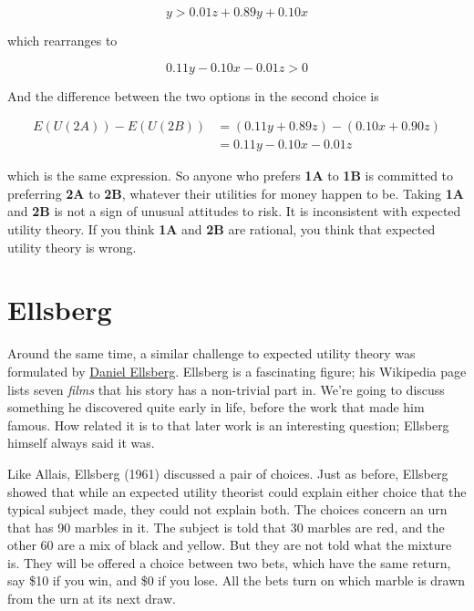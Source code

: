\documentclass[
  11pt,
  letterpaper,
]{scrbook}
\begin{document}
\begin{equation*}
y > 0.01z + 0.89y + 0.10x
\end{equation*}

which rearranges to

\begin{equation*}
0.11y - 0.10x - 0.01z > 0
\end{equation*}

And the difference between the two options in the second choice is

\begin{align*}
E(U(2A)) - E(U(2B)) &= (0.11y + 0.89z) - (0.10x + 0.90z) \\
&= 0.11y - 0.10x - 0.01z
\end{align*}

which is the same expression. So anyone who prefers \textbf{1A} to
\textbf{1B} is committed to preferring \textbf{2A} to \textbf{2B},
whatever their utilities for money happen to be. Taking \textbf{1A} and
\textbf{2B} is not a sign of unusual attitudes to risk. It is
inconsistent with expected utility theory. If you think \textbf{1A} and
\textbf{2B} are rational, you think that expected utility theory is
wrong.

\section{Ellsberg}\label{sec-ellsberg}

Around the same time, a similar challenge to expected utility theory was
formulated by
\href{https://en.wikipedia.org/wiki/Daniel_Ellsberg}{Daniel Ellsberg}.
Ellsberg is a fascinating figure; his Wikipedia page lists seven
\emph{films} that his story has a non-trivial part in. We're going to
discuss something he discovered quite early in life, before the work
that made him famous. How related it is to that later work is an
interesting question; Ellsberg himself always said it was.

Like Allais, Ellsberg (1961) discussed a pair of choices. Just as
before, Ellsberg showed that while an expected utility theorist could
explain either choice that the typical subject made, they could not
explain both. The choices concern an urn that has 90 marbles in it. The
subject is told that 30 marbles are red, and the other 60 are a mix of
black and yellow. But they are not told what the mixture is. They will
be offered a choice between two bets, which have the same return, say
\$10 if you win, and \$0 if you lose. All the bets turn on which marble
is drawn from the urn at its next draw.
\end{document}
